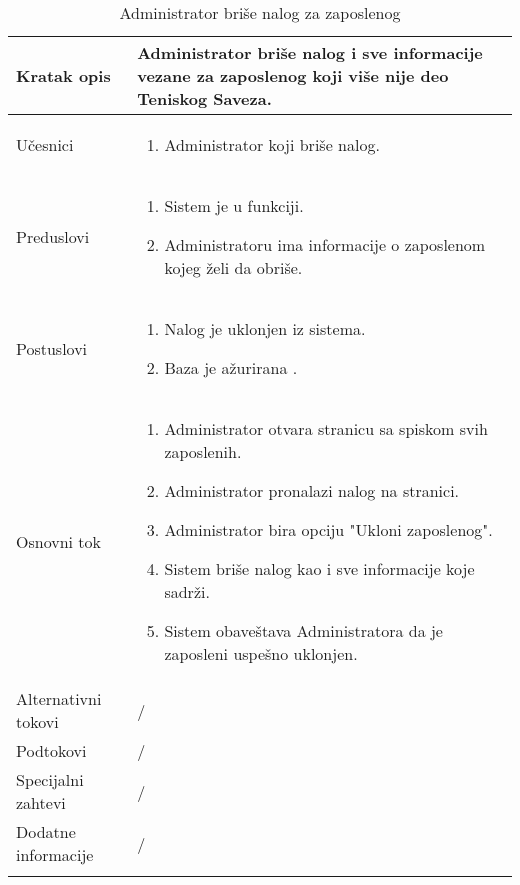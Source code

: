 \documentclass{article}
\begin{document}
\begin{longtable}{| p{} | p{} |} 
\hline
    Kratak opis & Administrator briše nalog i sve informacije vezane za zaposlenog koji više nije deo Teniskog Saveza.\\ 
\hline    
    Učesnici & \begin{enumerate}
        \item Administrator koji briše nalog.
    \end{enumerate}
    \\
\hline
   Preduslovi & \begin{enumerate}
       \item Sistem je u funkciji.
       \item Administratoru ima informacije o zaposlenom kojeg želi da obriše.
   \end{enumerate}\\
\hline  
    Postuslovi & \begin{enumerate}
        \item Nalog je uklonjen iz sistema.
        \item Baza je ažurirana .
        
    \end{enumerate}\\
\hline
    Osnovni tok & \begin{enumerate}
        \item Administrator otvara stranicu sa spiskom svih zaposlenih.
        \item Administrator pronalazi nalog na stranici.
        \item Administrator bira opciju "Ukloni zaposlenog".
        \item Sistem briše nalog kao i sve informacije koje sadrži.
        \item Sistem obaveštava Administratora da je zaposleni uspešno uklonjen.
    \end{enumerate}\\
\hline
    Alternativni tokovi & /\\
\hline
    Podtokovi & /\\
\hline
    Specijalni zahtevi & /\\
\hline
    Dodatne informacije & /\\
\hline
\caption{Administrator briše nalog za zaposlenog} 
\end{longtable}
\end{document}
